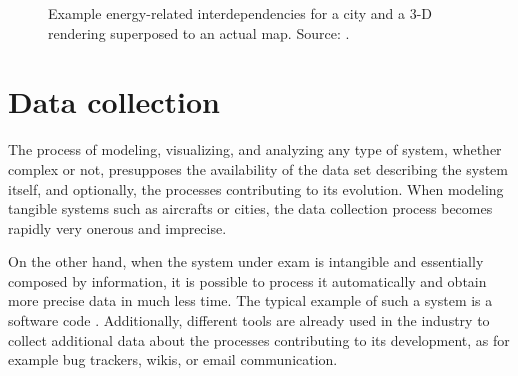 \begin{figure}[!h]
\begin{adjustwidth}{0cm}{0cm}
	\hspace{1.7cm}
	\caption[Example energy-related interdependencies for a city and a 3-D rendering superposed to an actual map.]{Example energy-related interdependencies for a city and a 3-D rendering superposed to an actual map. Source: \cite{citynet}.}
	\label{fig:citynet}
\end{adjustwidth}
\end{figure}

\section{Data collection}
\label{sec:intro/collection}

The process of modeling, visualizing, and analyzing any type of system, whether complex or not, presupposes the availability of the data set describing the system itself, and optionally, the processes contributing to its evolution. When modeling tangible systems such as aircrafts or cities, the data collection process becomes rapidly very onerous and imprecise.

On the other hand, when the system under exam is intangible and essentially composed by information, it is possible to process it automatically and obtain more precise data in much less time. The typical example of such a system is a software code \cite{mc1,mc2,mc3}. Additionally, different tools are already used in the industry to collect additional data about the processes contributing to its development, as for example bug trackers, wikis, or email communication.

